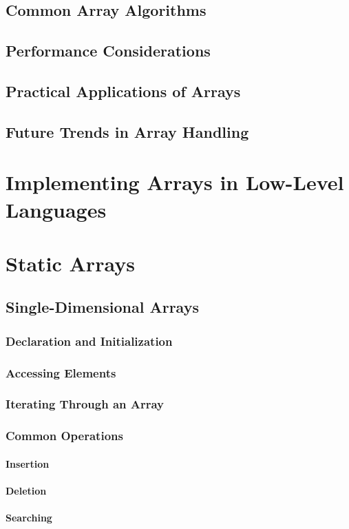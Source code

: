 \documentclass[12pt, oneside]{book}
\begin{document}
	\section{Common Array Algorithms}
	\section{Performance Considerations}
	\section{Practical Applications of Arrays}
	\section{Future Trends in Array Handling}
	\chapter{Implementing Arrays in Low-Level Languages}
	\chapter{Static Arrays}
	\section{Single-Dimensional Arrays}
	\subsection{Declaration and Initialization}
	\subsection{Accessing Elements}
	\subsection{Iterating Through an Array}
	\subsection{Common Operations}
	\subsubsection{Insertion}
	\subsubsection{Deletion}
	\subsubsection{Searching}
\end{document}
